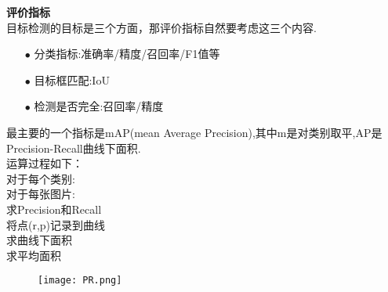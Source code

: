 \begin{frame}
    \noindent\large\textbf{评价指标}\\
    \vspace{1em}
    目标检测的目标是三个方面，那评价指标自然要考虑这三个内容.\\
    \vspace{1em}
    \begin{itemize}
        \item[$ \bullet $]分类指标:准确率/精度/召回率/F1值等
        \item[$ \bullet $]目标框匹配:IoU
        \item[$ \bullet $] 检测是否完全:召回率/精度
    \end{itemize}
    \vspace{1em}
    最主要的一个指标是mAP(mean Average Precision),其中m是对类别取平,AP是Precision-Recall曲线下面积.\\
    运算过程如下：\\
    对于每个类别:\\
    \qquad 对于每张图片:\\
    \qquad\qquad    求Precision和Recall\\
    \qquad\qquad   将点(r,p)记录到曲线\\
    \qquad    求曲线下面积\\
    求平均面积\\
    \vspace{-3.55cm}
    \begin{figure}
        \hspace{6cm}
        \texttt{[image: PR.png]}
    \end{figure}


\end{frame}
